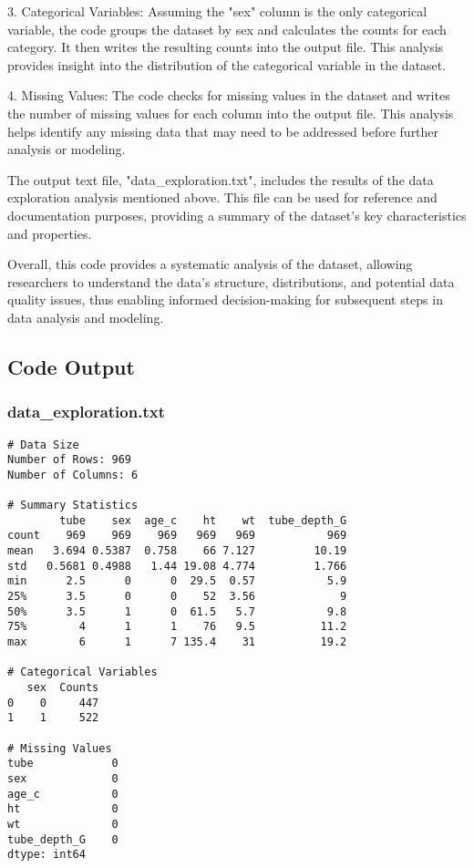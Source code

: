\documentclass[11pt]{article}
\begin{document}
3. Categorical Variables:
   Assuming the "sex" column is the only categorical variable, the code groups the dataset by sex and calculates the counts for each category. It then writes the resulting counts into the output file. This analysis provides insight into the distribution of the categorical variable in the dataset.

4. Missing Values:
   The code checks for missing values in the dataset and writes the number of missing values for each column into the output file. This analysis helps identify any missing data that may need to be addressed before further analysis or modeling.

The output text file, "data\_exploration.txt", includes the results of the data exploration analysis mentioned above. This file can be used for reference and documentation purposes, providing a summary of the dataset's key characteristics and properties.

Overall, this code provides a systematic analysis of the dataset, allowing researchers to understand the data's structure, distributions, and potential data quality issues, thus enabling informed decision-making for subsequent steps in data analysis and modeling.

\subsection{Code Output}

\subsubsection*{data\_exploration.txt}

\begin{Verbatim}[tabsize=4]
# Data Size
Number of Rows: 969
Number of Columns: 6

# Summary Statistics
        tube    sex  age_c    ht    wt  tube_depth_G
count    969    969    969   969   969           969
mean   3.694 0.5387  0.758    66 7.127         10.19
std   0.5681 0.4988   1.44 19.08 4.774         1.766
min      2.5      0      0  29.5  0.57           5.9
25%      3.5      0      0    52  3.56             9
50%      3.5      1      0  61.5   5.7           9.8
75%        4      1      1    76   9.5          11.2
max        6      1      7 135.4    31          19.2

# Categorical Variables
   sex  Counts
0    0     447
1    1     522

# Missing Values
tube            0
sex             0
age_c           0
ht              0
wt              0
tube_depth_G    0
dtype: int64


\end{Verbatim}
\end{document}
